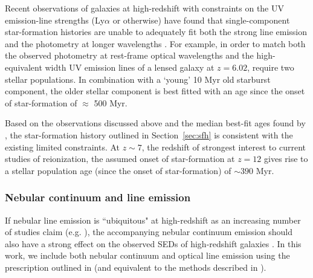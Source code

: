 Recent observations of galaxies at high-redshift with constraints on the UV emission-line strengths (Ly$\alpha$ or otherwise) have found that single-component star-formation histories are unable to adequately fit both the strong line emission and the photometry at longer wavelengths \citep{RodriguezEspinosa:2014cs,Stark:2014vc}. For example, in order to match both the observed photometry at rest-frame optical wavelengths and the high-equivalent width UV emission lines of a lensed galaxy at $z = 6.02$, \citet{Stark:2014vc} require two stellar populations. In combination with a `young' 10 Myr old starburst component, the older stellar component is best fitted with an age since the onset of star-formation of $\approx$ 500 Myr.

Based on the observations discussed above and the median best-fit ages found by \citet{2013MNRAS.429..302C}, the star-formation history outlined in Section~\ref{sec:sfh} is consistent with the existing limited constraints. At $z\sim7$, the redshift of strongest interest to current studies of reionization, the assumed onset of star-formation at $z=12$ gives rise to a stellar population age (since the onset of star-formation) of $\sim390$ Myr. 

\subsubsection{Nebular continuum and line emission}\label{sec:neb}
If nebular line emission is ``ubiquitous" at high-redshift as an increasing number of studies claim (e.g. \citet{Shim:2011cw,Stark:2013ix,Smit:2013ud}), the accompanying nebular continuum emission should also have a strong effect on the observed SEDs of high-redshift galaxies \citep{Reines:2009gs}. In this work, we include both nebular continuum and optical line emission using the prescription outlined in \citet{Duncan:2014gh} (and equivalent to the methods described in \citet{Ono:2010ed,2010A&A...515A..73S,2011MNRAS.418.2074M}). 


